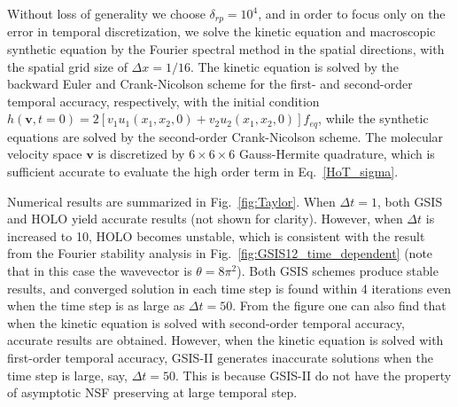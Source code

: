 \documentclass[onefignum,onetabnum]{siamart171218}
\begin{document}
Without loss of generality we choose $\delta_{rp}=10^4$, and in order to focus only on the error in temporal discretization, we solve the kinetic equation and macroscopic synthetic equation by the Fourier spectral method in the spatial directions, with the spatial grid size of $\Delta{x}=1/16$. The kinetic equation is solved by the backward Euler and Crank-Nicolson scheme for the first- and second-order temporal accuracy, respectively, with the initial condition
$
h(\bm{v},t=0)=2[v_1u_1(x_1,x_2,0)+v_2u_2(x_1,x_2,0)]f_{eq}$,
while the synthetic equations are solved by the second-order Crank-Nicolson scheme. The molecular velocity space $\bm{v}$ is discretized by $6\times6\times6$ Gauss-Hermite quadrature, which is sufficient accurate to evaluate the high order term in Eq.~\eqref{HoT_sigma}.




Numerical results are summarized in Fig.~\ref{fig:Taylor}. When $\Delta{t}=1$, both GSIS and HOLO yield accurate results (not shown for clarity). However, when $\Delta{t}$ is increased to 10, HOLO becomes unstable, which is consistent with the result from the Fourier stability analysis in Fig.~\ref{fig:GSIS12_time_dependent} (note that in this case the wavevector is $\theta=8\pi^2$).  Both GSIS schemes produce stable results, and converged solution in each time step is found within 4 iterations even when the time step is as large as $\Delta{t}=50$. From the figure one can also find that when the kinetic equation is solved with second-order temporal accuracy, accurate results are obtained. However, when the kinetic equation is solved with first-order temporal accuracy, GSIS-II generates inaccurate solutions when the time step is large, say, $\Delta{t}=50$. This is because GSIS-II do not have the property of asymptotic NSF preserving at large temporal step.
\end{document}
